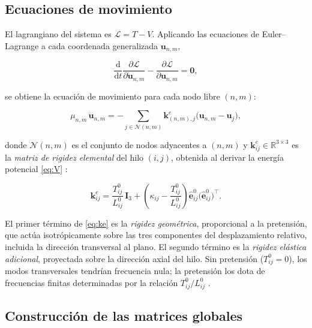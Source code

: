 \documentclass[11pt,letterpaper]{article}
\begin{document}
\subsection{Ecuaciones de movimiento}

El lagrangiano del sistema es $\mathcal{L} = T - V$. Aplicando las
ecuaciones de Euler--Lagrange a cada coordenada generalizada
$\mathbf{u}_{n,m}$,

\begin{equation}\label{eq:EL}
    \frac{\mathrm{d}}{\mathrm{d}t}
    \frac{\partial\mathcal{L}}{\partial\dot{\mathbf{u}}_{n,m}}
    -
    \frac{\partial\mathcal{L}}{\partial\mathbf{u}_{n,m}}
    = \mathbf{0},
\end{equation}

se obtiene la ecuación de movimiento para cada nodo libre $(n,m)$:

\begin{equation}\label{eq:eom_local}
    \mu_{n,m}\,\ddot{\mathbf{u}}_{n,m}
    =
    -\sum_{j\in\mathcal{N}(n,m)}
    \mathbf{k}^e_{(n,m),j}
    \bigl(\mathbf{u}_{n,m} - \mathbf{u}_j\bigr),
\end{equation}

donde $\mathcal{N}(n,m)$ es el conjunto de nodos adyacentes a $(n,m)$ y
$\mathbf{k}^e_{ij} \in \mathbb{R}^{3\times 3}$ es la \emph{matriz de
rigidez elemental} del hilo $(i,j)$, obtenida al derivar la energía
potencial \eqref{eq:V} \cite{jayaraman1981,meirovitch2001}:

\begin{equation}\label{eq:ke}
    \mathbf{k}^e_{ij}
    =
    \frac{T^0_{ij}}{L^0_{ij}}\,\mathbf{I}_3
    +
    \left(\kappa_{ij} - \frac{T^0_{ij}}{L^0_{ij}}\right)
    \hat{\mathbf{e}}^0_{ij}\bigl(\hat{\mathbf{e}}^0_{ij}\bigr)^\top.
\end{equation}

El primer término de \eqref{eq:ke} es la \emph{rigidez geométrica},
proporcional a la pretensión, que actúa isotrópicamente sobre las tres
componentes del desplazamiento relativo, incluida la dirección transversal
al plano. El segundo término es la \emph{rigidez elástica adicional},
proyectada sobre la dirección axial del hilo. Sin pretensión
($T^0_{ij}=0$), los modos transversales tendrían frecuencia nula; la
pretensión los dota de frecuencias finitas determinadas por la relación
$T^0_{ij}/L^0_{ij}$ \cite{lott2022,frohlich1982,wirth2011}.

\subsection{Construcción de las matrices globales}
\end{document}
